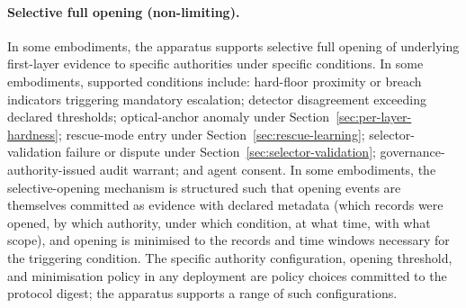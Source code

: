 \documentclass[a4paper,12pt]{article}
\begin{document}
\paragraph{Selective full opening (non-limiting).}
In some embodiments, the apparatus supports selective full opening
of underlying first-layer evidence to specific authorities under
specific conditions. In some embodiments, supported conditions
include: hard-floor proximity or breach indicators triggering
mandatory escalation; detector disagreement exceeding declared
thresholds; optical-anchor anomaly under
Section~\ref{sec:per-layer-hardness}; rescue-mode entry under
Section~\ref{sec:rescue-learning}; selector-validation failure
or dispute under Section~\ref{sec:selector-validation};
governance-authority-issued audit warrant; and agent consent. In
some embodiments, the selective-opening mechanism is structured
such that opening events are themselves committed as evidence with
declared metadata (which records were opened, by which authority,
under which condition, at what time, with what scope), and opening
is minimised to the records and time windows necessary for the
triggering condition. The specific authority configuration, opening
threshold, and minimisation policy in any deployment are policy
choices committed to the protocol digest; the apparatus supports a
range of such configurations.
\end{document}
